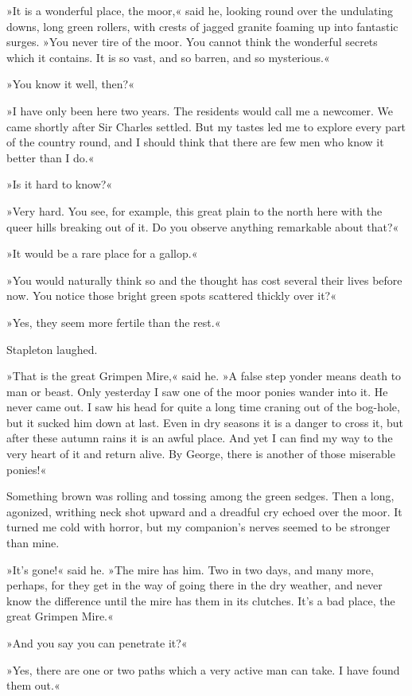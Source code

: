 »It is a wonderful place, the moor,« said he, looking round over the undulating downs, long green rollers, with crests of jagged granite foaming up into fantastic surges. »You never tire of the moor. You cannot think the wonderful secrets which it contains. It is so vast, and so barren, and so mysterious.«

»You know it well, then?«

»I have only been here two years. The residents would call me a newcomer. We came shortly after Sir Charles settled. But my tastes led me to explore every part of the country round, and I should think that there are few men who know it better than I do.«

»Is it hard to know?«

»Very hard. You see, for example, this great plain to the north here with the queer hills breaking out of it. Do you observe anything remarkable about that?«

»It would be a rare place for a gallop.«

»You would naturally think so and the thought has cost several their lives before now. You notice those bright green spots scattered thickly over it?«

»Yes, they seem more fertile than the rest.«

Stapleton laughed.

»That is the great Grimpen Mire,« said he. »A false step yonder means death to man or beast. Only yesterday I saw one of the moor ponies wander into it. He never came out. I saw his head for quite a long time craning out of the bog-hole, but it sucked him down at last. Even in dry seasons it is a danger to cross it, but after these autumn rains it is an awful place. And yet I can find my way to the very heart of it and return alive. By George, there is another of those miserable ponies!«

Something brown was rolling and tossing among the green sedges. Then a long, agonized, writhing neck shot upward and a dreadful cry echoed over the moor. It turned me cold with horror, but my companion's nerves seemed to be stronger than mine.

»It's gone!« said he. »The mire has him. Two in two days, and many more, perhaps, for they get in the way of going there in the dry weather, and never know the difference until the mire has them in its clutches. It's a bad place, the great Grimpen Mire.«

»And you say you can penetrate it?«

»Yes, there are one or two paths which a very active man can take. I have found them out.«


